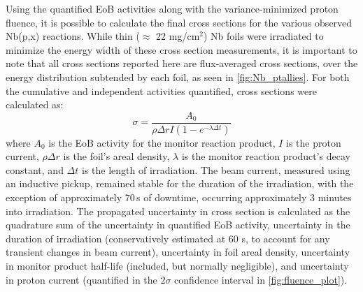 \documentclass[3p]{elsarticle}
\newcommand{\pp}[1]{\left( #1\right)}
\begin{document}
Using the quantified EoB activities along with the variance-minimized proton fluence, it is possible to calculate the final cross sections for the various observed Nb(p,x) reactions.
While thin ($\approx$ 22 mg/cm$^2$) Nb foils were irradiated to minimize the energy width of these cross section measurements, it is important to note that all cross sections reported here are flux-averaged cross sections, over the energy distribution subtended by each foil, as seen in \autoref{fig:Nb_ptallies}.
For both the cumulative and independent activities quantified, cross sections were calculated as:
\begin{equation}
\sigma = \dfrac{A_0 }{\rho \Delta r I \pp{1-e^{-\lambda \Delta t}} }
\end{equation}
where $A_0$ is the EoB activity for the monitor reaction product, $I$ is the proton current, $\rho \Delta r$ is the foil's areal density, $\lambda$ is the monitor reaction product's decay constant, and $\Delta t$ is the length of irradiation.
The beam current, measured using an inductive pickup, remained stable for the duration of the irradiation, with the exception of approximately 70\,s of downtime,  occurring approximately 3 minutes into irradiation.
The propagated uncertainty in cross section is calculated as the quadrature sum of the uncertainty in quantified EoB activity, uncertainty in the duration of irradiation (conservatively estimated at 60 s, to account for any transient changes in beam current), uncertainty in foil areal density, uncertainty in monitor product half-life (included, but normally negligible),  and uncertainty in proton current (quantified in the $2\sigma$ confidence interval in \autoref{fig:fluence_plot}).





 
\end{document}
